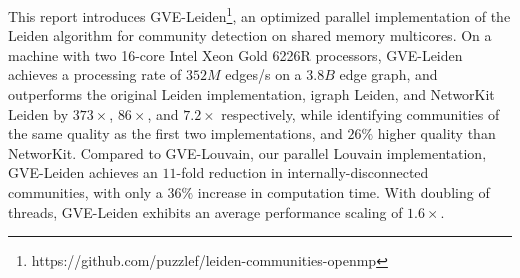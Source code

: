 This report introduces GVE-Leiden\footnote{https://github.com/puzzlef/leiden-communities-openmp}, an optimized parallel implementation of the Leiden algorithm for community detection on shared memory multicores. On a machine with two 16-core Intel Xeon Gold 6226R processors, GVE-Leiden achieves a processing rate of $352 M$ edges/s on a $3.8 B$ edge graph, and outperforms the original Leiden implementation, igraph Leiden, and NetworKit Leiden by $373\times$, $86\times$, and $7.2\times$ respectively, while identifying communities of the same quality as the first two implementations, and $26\%$ higher quality than NetworKit. Compared to GVE-Louvain, our parallel Louvain implementation, GVE-Leiden achieves an $11$-fold reduction in internally-disconnected communities, with only a $36\%$ increase in computation time. With doubling of threads, GVE-Leiden exhibits an average performance scaling of $1.6\times$.








